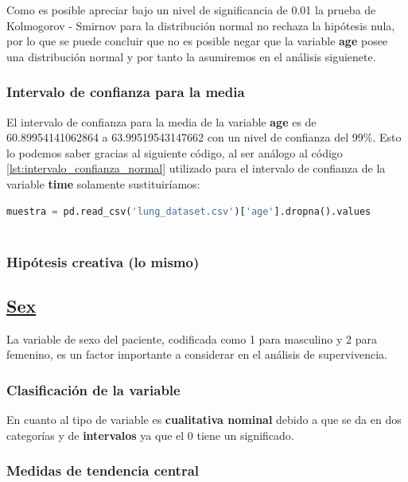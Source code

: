 \documentclass[a4paper,12pt]{article}
\begin{document}
    Como es posible apreciar bajo un nivel de significancia de 0.01 la prueba de Kolmogorov - Smirnov para la distribución normal no rechaza la hipótesis nula, por lo que se puede concluir que no es posible negar que la variable \textbf{age} posee una distribución normal y por tanto la  asumiremos en el análisis siguienete.
    
    \subsubsection*{Intervalo de confianza para la media}

    El intervalo de confianza para la media de la variable \textbf{age} es de 60.89954141062864 a 63.99519543147662 con un nivel de confianza del 99\%. Esto lo podemos saber gracias al siguiente código, al ser análogo al código \ref{lst:intervalo_confianza_normal} utilizado para el intervalo de confianza de la variable \textbf{time} solamente sustituiríamos:

    \begin{lstlisting}[language=Python, caption={Código en Python para calcular el intervalo de confianza}]
muestra = pd.read_csv('lung_dataset.csv')['age'].dropna().values
    
    \end{lstlisting}

    \subsubsection*{Hipótesis creativa (lo mismo)}

    \subsection*{\underline{Sex}}

    La variable de sexo del paciente, codificada como 1 para masculino y 2 para femenino, es un factor importante a considerar en el análisis de supervivencia.

    \subsubsection*{Clasificación de la variable}

    En cuanto al tipo de variable es \textbf{cualitativa nominal} debido a que se da en dos categorías y de \textbf{intervalos} ya que el 0 tiene un significado.

    \subsubsection*{Medidas de tendencia central}
\end{document}
